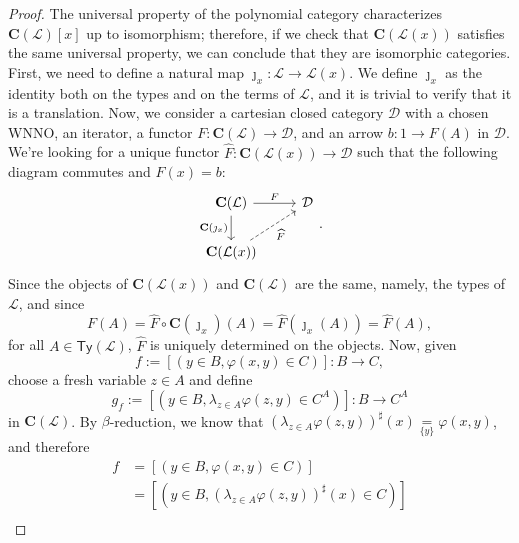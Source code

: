 \begin{proof}
    The universal property of the polynomial category characterizes $\mathbf C(\mathcal L)[x]$ up to isomorphism; therefore, if we check that $\mathbf C(\mathcal L(x))$ satisfies the same universal property, we can conclude that they are isomorphic categories.\newline
    First, we need to define a natural map $\jmath_x : \mathcal L \to \mathcal L(x)$. We define $\jmath_x$ as the identity both on the types and on the terms of $\mathcal L$, and it is trivial to verify that it is a translation. Now, we consider a cartesian closed category $\mathcal D$ with a chosen WNNO, an iterator,
    a functor $F : \mathbf C(\mathcal L) \to \mathcal D$, and an arrow $b : 1 \to F(A)$ in $\mathcal D$. We're looking for a unique functor $\widehat F : \mathbf C(\mathcal L(x)) \to \mathcal D$ such that the following diagram commutes and $\widehat F(x) = b$:
    \[\begin{tikzcd}
        {\mathbf C(\mathcal L)} & {\mathcal D} \\
        {\mathbf C(\mathcal L(x))}
        \arrow["F", from=1-1, to=1-2]
        \arrow["{\mathbf C(\jmath_x)}"', from=1-1, to=2-1]
        \arrow["{\widehat F}"', dashed, from=2-1, to=1-2]
    \end{tikzcd}.\]
    Since the objects of $\mathbf C(\mathcal L(x))$ and $\mathbf C(\mathcal L)$ are the same, namely, the types of $\mathcal L$, and since
    \[ F(A) = \widehat F \circ \mathbf C(\jmath_x)(A) = \widehat F(\jmath_x(A)) = \widehat F(A), \]
    for all $A \in \mathsf{Ty}(\mathcal L)$, $\widehat{F}$ is uniquely determined on the objects.\newline
    Now, given
    \[ f := [(y \in B,\varphi(x,y) \in C)] : B \to C, \]
    choose a fresh variable $z \in A$ and define
    \[ g_f := [(y \in B,\lambda_{z \in A}\varphi(z,y) \in C^A)] : B \to C^A \]
    in $\mathbf C(\mathcal L)$. By $\beta$-reduction, we know that $(\lambda_{z \in A}\varphi(z,y))^\sharp(x) \underset{\{y\}}{=} \varphi(x,y)$, and therefore
    \begin{align*}
        f &= [(y \in B,\varphi(x,y) \in C)] \\
          &= [(y \in B,(\lambda_{z \in A}\varphi(z,y))^\sharp(x) \in C)] \\

\end{align*}
\end{proof}

